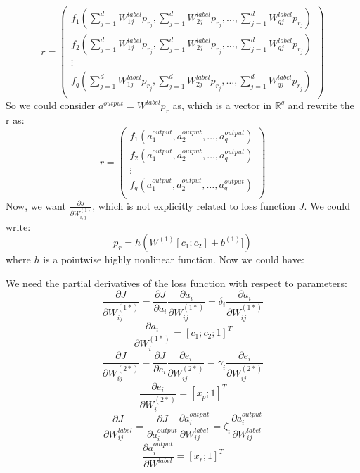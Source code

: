 \documentclass[twoside,12pt]{article}
\begin{document}
\begin{equation}
r =
\begin{pmatrix}
  f_1(\sum_{j=1}^{d}W^{label}_{1j} p_{r_j}, \sum_{j=1}^{d}W^{label}_{2j}p_{r_j},\ldots, \sum_{j=1}^{d}W^{label}_{qj}p_{r_j})\\
   f_2(\sum_{j=1}^{d}W^{label}_{1j}p_{r_j}, \sum_{j=1}^{d}W^{label}_{2j}p_{r_j},\ldots, \sum_{j=1}^{d}W^{label}_{qj}p_{r_j}) \\
  \vdots  \\
    f_q(\sum_{j=1}^{d}W^{label}_{1j}p_{r_j}, \sum_{j=1}^{d}W^{label}_{2j}p_{r_j},\ldots, \sum_{j=1}^{d}W^{label}_{qj}p_{r_j})\\
 \end{pmatrix}
\end{equation}
 So we could consider $a^{output}=W^{label}p_r$ as, which is a vector in $\mathbb{R}^q$ and rewrite the r as:
 \begin{equation}
 r=
 \begin{pmatrix}
 f_1(a^{output}_1,a^{output}_2,\ldots,a^{output}_q)\\
  f_2(a^{output}_1,a^{output}_2,\ldots,a^{output}_q)\\
\vdots \\
 f_q(a^{output}_1,a^{output}_2,\ldots,a^{output}_q)\\
 \end{pmatrix}
\end{equation}
Now, we want $\frac{\partial J}{\partial W^{(1)}_{i,j}}$, which is not explicitly related to loss function $J$. We could write:
\begin{equation}
p_r=h(W^{(1)}[c_1;c_2]+b^{(1)}])
\end{equation} 
where $h$ is a pointwise highly nonlinear function. Now we could have:

We need the partial derivatives of the loss function with respect to parameters:
\begin{equation}
\frac{\partial J}{\partial W^{(1*)}_{ij}} = \frac{\partial J}{\partial a_i}\frac{\partial a_i}{\partial W^{(1*)}_{ij}}=\delta_i \frac{\partial a_i}{\partial W^{(1*)}_{ij}}
\end{equation}
\begin{equation}
\frac{\partial a_i}{\partial W^{(1*)}_i}=[c_1;c_2;1]^T
\end{equation}
\begin{equation}
\frac{\partial J}{\partial W^{(2*)}_{ij}} = \frac{\partial J}{\partial e_i}\frac{\partial e_i}{\partial W^{(2*)}_{ij}}=\gamma_i \frac{\partial e_i}{\partial W^{(2*)}_{ij}}
\end{equation}
\begin{equation}
\frac{\partial e_i}{\partial W^{(2*)}_i}=[x_p;1]^T
\end{equation}
\begin{equation}
\frac{\partial J}{\partial W^{label}_{ij}} = \frac{\partial J}{\partial a^{output}_i}\frac{\partial a^{output}_i}{\partial W^{label}_{ij}}=\zeta_i \frac{\partial a^{output}_i}{\partial W^{label}_{ij}}
\end{equation}
\begin{equation}
\frac{\partial a^{output}_i}{\partial W^{label}}=[x_r;1]^T
\end{equation}
\end{document}
